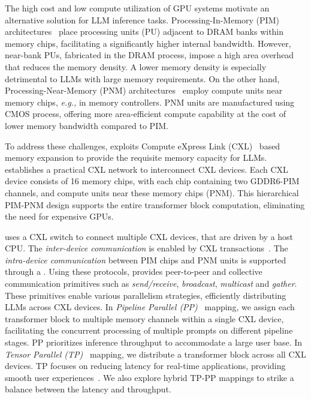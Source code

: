 \label{PIM}
The high cost and low compute utilization of GPU systems motivate an alternative solution for LLM inference tasks. Processing-In-Memory (PIM) architectures~\cite{aim1, aim2, aim3, aim4, fimdram, upmem, axdimm, to-pim, floatpim, sky, ultra, impala, aquabolt, sparsep, binary} place processing units (PU) adjacent to DRAM banks within memory chips, facilitating a significantly higher internal bandwidth.
However, near-bank PUs, fabricated in the DRAM process, impose a high area overhead that reduces the memory density.
A lower memory density is especially detrimental to LLMs with large memory requirements.
On the other hand, Processing-Near-Memory (PNM) architectures~\cite{cxl-pnm, samsung_pimpnm, noise, recnmp, enmc, HB-PNM, nda, trim, gomez2023evaluating, oliveira2022accelerating, gomez2022benchmarking} employ compute units near memory chips, \textit{e.g.,} in memory controllers.
PNM units are manufactured using CMOS process, offering more area-efficient compute capability at the cost of lower memory bandwidth compared to PIM.

To address these challenges, \att{} exploits Compute eXpress Link (CXL)~\cite{CXL} based memory expansion to provide the requisite memory capacity for LLMs.
\att{} establishes a practical CXL network to interconnect CXL devices.
Each CXL device consists of 16 memory chips, with each chip containing two GDDR6-PIM channels, and compute units near these memory chips (PNM).
This hierarchical PIM-PNM design supports the entire transformer block computation, eliminating the need for expensive GPUs.

\att{} uses a CXL switch to connect multiple CXL devices, that are driven by a host CPU.
The \textit{inter-device communication} is enabled by CXL transactions~\cite{CXL}.
The \textit{intra-device communication} between PIM chips and PNM units is supported through a \rf{}.
Using these protocols, \att{} provides peer-to-peer and collective communication primitives such as \textit{send/receive}, \textit{broadcast}, \textit{multicast} and \textit{gather}.
These primitives enable various parallelism strategies, efficiently distributing LLMs across CXL devices.
In \textit{Pipeline Parallel (PP)}~\cite{gpipe} mapping, we assign each transformer block to multiple memory channels within a single CXL device, facilitating the concurrent processing of multiple prompts on different pipeline stages.
PP prioritizes inference throughput to accommodate a large user base.
In \textit{Tensor Parallel (TP)}~\cite{alpa, megatron} mapping, we distribute a transformer block across all CXL devices.
TP focuses on reducing latency for real-time applications, providing smooth user experiences~\cite{fowers2018configurable}. 
We also explore hybrid TP-PP mappings to strike a balance between the latency and throughput.

